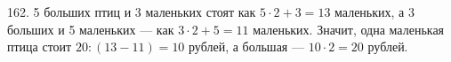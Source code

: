 162. 5 больших птиц и 3 маленьких стоят как $5\cdot2+3=13$ маленьких, а 3 больших и 5 маленьких --- как $3\cdot2+5=11$ маленьких. Значит, одна маленькая птица стоит $20:(13-11)=10$ рублей, а большая --- $10\cdot2=20$ рублей.\\
